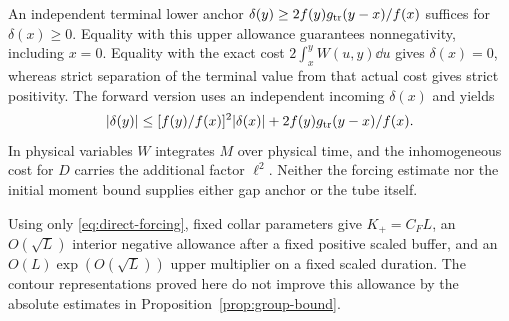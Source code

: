 An independent terminal lower anchor
$\delta(y)\ge2f(y)g_{\rm tr}(y-x)/f(x)$ suffices for
$\delta(x)\ge0$. Equality with this upper allowance guarantees
nonnegativity, including $x=0$. Equality with the exact cost
$2\int_x^y W(u,y)\dd u$ gives $\delta(x)=0$, whereas strict
separation of the terminal value from that actual cost gives strict
positivity. The forward version uses an independent incoming
$\delta(x)$ and yields
\[
 |\delta(y)|\le[f(y)/f(x)]^2|\delta(x)|
                 +2f(y)g_{\rm tr}(y-x)/f(x).
\]
In physical variables $W$ integrates $M$ over physical time, and the
inhomogeneous cost for $D$ carries the additional factor $\ell^2$.
Neither the forcing estimate nor the initial moment bound supplies
either gap anchor or the tube itself.

Using only \eqref{eq:direct-forcing}, fixed collar parameters give
$K_+=C_FL$, an $O(\sqrt L)$ interior negative allowance after a
fixed positive scaled buffer, and an
$O(L)\exp(O(\sqrt L))$ upper multiplier on a fixed scaled duration.
The contour representations proved here do not improve this allowance
by the absolute estimates in Proposition~\ref{prop:group-bound}.
